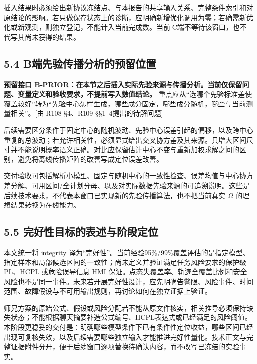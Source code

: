 \documentclass[12pt,a4paper]{article}
\begin{document}
插入结果时必须给出新协议冻结点、与本报告的共享输入关系、完整条件索引和对原结论的影响。若只做保存状态上的诊断，应明确新增优化调用为零；若确需新优化或新观测，则独立登记，不能计入当前完成数。当前
C端不等待该窗口，也不代写其尚未获得的结果。

\subsection{5.4
B端先验传播分析的预留位置}\label{bux7aefux5148ux9a8cux4f20ux64adux5206ux6790ux7684ux9884ux7559ux4f4dux7f6e}

\textbf{预留接口
B-PRIOR：在本节之后插入实际先验来源与传播分析。当前仅保留问题、变量定义和验收要求，不提前写入数值结论。}
重点应从``选哪个先验标准差使覆盖较好''转为``先验中心怎样生成，哪些成分固定，哪些成分随机，哪些与当前测量相关''。{[}由
R108 §4、R109 §§1--4提出的待解问题{]}

后续需要区分条件于固定中心的随机波动、先验中心误差引起的偏移，以及跨中心重复的总波动；若允许相关性，必须显式给出交叉协方差及其来源。只增大区间尺寸并不能说明概率语义正确。对比应保留估计中心不变与重新加权求解之间的区别，避免将离线传播矩阵的改善写成定位误差改善。

交付验收可包括解析小模型、固定与随机中心的一致性检查、误差均值与中心协方差分解、可用区间/全计划分母、以及对实际数据先验来源的可追溯说明。这些是后续技术要求，不代表本窗口已实现新的先验传播算法，也不把当前真实
\(\Omega\) 的理想结果转换为在线能力。

\subsection{5.5
完好性目标的表述与阶段定位}\label{ux5b8cux597dux6027ux76eeux6807ux7684ux8868ux8ff0ux4e0eux9636ux6bb5ux5b9aux4f4d}

本文统一将 integrity
译为``完好性''。当前经验95\%/99\%覆盖评估的是指定模型、指定样本和局部候选区间的一致性；尚未定义并验证满足任务风险要求的保护级
PL、HCPL 或危险误导信息 HMI
保证。点态失覆盖率、轨迹全覆盖比例和安全风险也不是同一事件。未来若开展完好性设计，应先明确告警限、风险事件、时间范围、故障假设与不可用输出规则，再讨论如何在独立证据上验证。

师兄方案的原始公式、假设或风险分配若不能从原文件核实，相关推导必须保持缺失状态；不能根据聊天摘要补造公式编号、HCPL表达式或已经满足的风险阈值。本阶段更稳妥的交付是：明确哪些模型条件下已有条件性定位收益，哪些区间已经出现可复核失效，以及后续需要哪些独立输入才能推进完好性量化。技术正文与完整证据附件分开，便于后续窗口逐项替换待确认内容，而不改写已冻结的实验事实。
\end{document}

